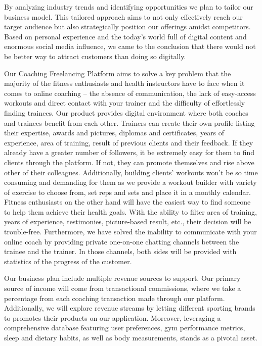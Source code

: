 \documentclass[12pt]{report}
\begin{document}
By analyzing industry trends and identifying opportunities we plan to tailor our business model. This tailored approach aims to not only effectively reach our target audience but also strategically position our offerings amidst competitors. Based on personal experience and the today’s world full of digital content and enormous social media influence, we came to the conclusion that there would not be better way to attract customers than doing so digitally.

Our Coaching Freelancing Platform aims to solve a key problem that the majority of the fitness enthusiasts and health instructors have to face when it comes to online coaching – the absence of communication, the lack of easy-access workouts and direct contact with your trainer and the difficulty of effortlessly finding trainees. Our product provides digital environment where both coaches and trainees benefit from each other. Trainers can create their own profile listing their expertise, awards and pictures, diplomas and certificates, years of experience, area of training, result of previous clients and their feedback. If they already have a greater number of followers, it be extremely easy for them to find clients through the platform. If not, they can promote themselves and rise above other of their colleagues. Additionally, building clients’ workouts won’t be so time consuming and demanding for them as we provide a workout builder with variety of exercise to choose from, set reps and sets and place it in a monthly calendar. Fitness enthusiasts on the other hand will have the easiest way to find someone to help them achieve their health goals. With the ability to filter area of training, years of experience, testimonies, picture-based result, etc., their decision will be trouble-free. Furthermore, we have solved the inability to communicate with your online coach by providing private one-on-one chatting channels between the trainee and the trainer. In those channels, both sides will be provided with statistics of the progress of the customer.

Our business plan include multiple revenue sources to support. Our primary source of income will come from transactional commissions, where we take a percentage from each coaching transaction made through our platform. Additionally, we will explore revenue streams by letting different sporting brands to promotes their products on our application. Moreover, leveraging a comprehensive database featuring user preferences, gym performance metrics, sleep and dietary habits, as well as body measurements, stands as a pivotal asset.
\end{document}
